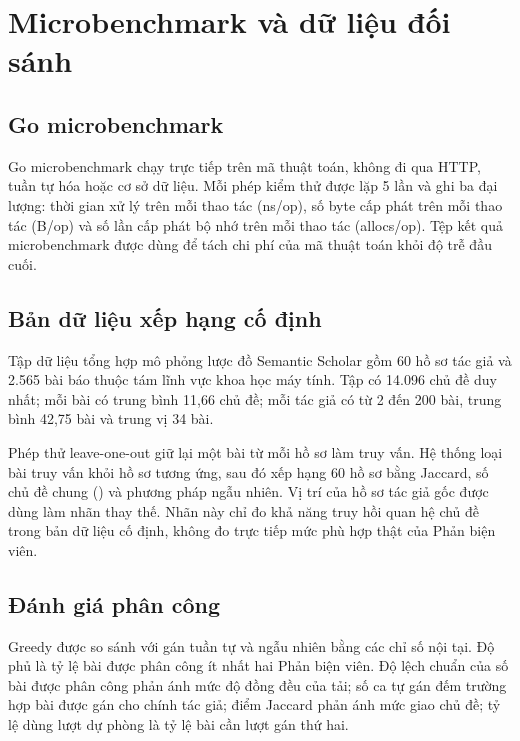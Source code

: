 \section{Microbenchmark và dữ liệu đối sánh}
\label{appc:algorithm-contract}

\subsection{Go microbenchmark}

Go microbenchmark chạy trực tiếp trên mã thuật toán, không đi qua HTTP, tuần tự hóa hoặc cơ sở dữ liệu. Mỗi phép kiểm thử được lặp 5 lần và ghi ba đại lượng: thời gian xử lý trên mỗi thao tác (ns/op), số byte cấp phát trên mỗi thao tác (B/op) và số lần cấp phát bộ nhớ trên mỗi thao tác (allocs/op). Tệp kết quả microbenchmark được dùng để tách chi phí của mã thuật toán khỏi độ trễ đầu cuối.

\subsection{Bản dữ liệu xếp hạng cố định}

Tập dữ liệu tổng hợp mô phỏng lược đồ Semantic Scholar gồm 60 hồ sơ tác giả và 2.565 bài báo thuộc tám lĩnh vực khoa học máy tính. Tập có 14.096 chủ đề duy nhất; mỗi bài có trung bình 11,66 chủ đề; mỗi tác giả có từ 2 đến 200 bài, trung bình 42,75 bài và trung vị 34 bài.

Phép thử leave-one-out giữ lại một bài từ mỗi hồ sơ làm truy vấn. Hệ thống loại bài truy vấn khỏi hồ sơ tương ứng, sau đó xếp hạng 60 hồ sơ bằng Jaccard, số chủ đề chung () và phương pháp ngẫu nhiên. Vị trí của hồ sơ tác giả gốc được dùng làm nhãn thay thế. Nhãn này chỉ đo khả năng truy hồi quan hệ chủ đề trong bản dữ liệu cố định, không đo trực tiếp mức phù hợp thật của Phản biện viên.

\subsection{Đánh giá phân công}

Greedy được so sánh với gán tuần tự và ngẫu nhiên bằng các chỉ số nội tại. Độ phủ là tỷ lệ bài được phân công ít nhất hai Phản biện viên. Độ lệch chuẩn của số bài được phân công phản ánh mức độ đồng đều của tải; số ca tự gán đếm trường hợp bài được gán cho chính tác giả; điểm Jaccard phản ánh mức giao chủ đề; tỷ lệ dùng lượt dự phòng là tỷ lệ bài cần lượt gán thứ hai.

